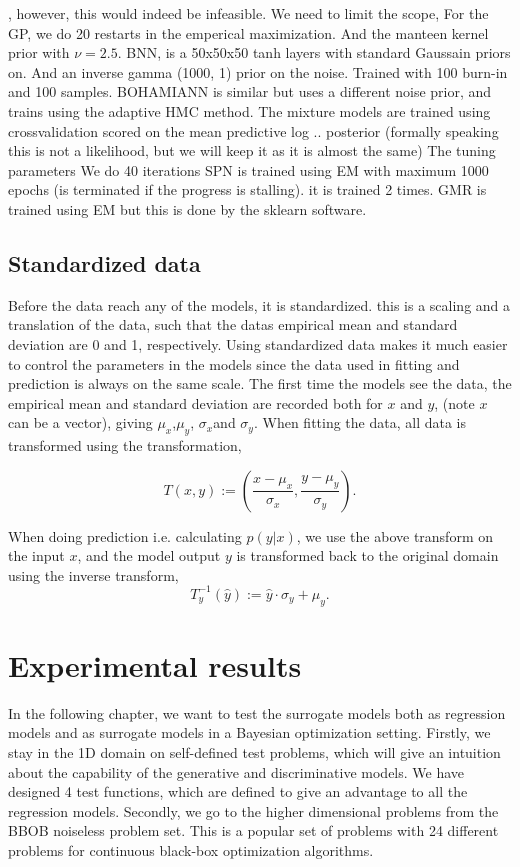 , however, this would indeed be infeasible. We need to limit the scope, 
For the GP, we do 20 restarts in the emperical maximization. And the manteen kernel prior
with $\nu = 2.5$. 
BNN, is a 50x50x50 tanh layers with standard Gaussain priors on. And an inverse gamma (1000, 1)
prior on the noise. Trained with 100 burn-in and 100 samples. 
BOHAMIANN is similar but uses a different noise prior, and trains using the adaptive HMC method. 
The mixture models are trained using crossvalidation scored on the mean predictive log .. posterior
(formally speaking this is not a likelihood, but we will keep it as it is almost the same)
The tuning parameters 
We do 40 iterations 
SPN is trained using EM with maximum 1000 epochs (is terminated if the progress is stalling). 
it is trained 2 times. 
GMR is trained using EM but this is done by the sklearn software. 

\section{Standardized data}
Before the data reach any of the models, it is standardized. this is a scaling and a translation
of the data, such that the datas empirical mean and standard deviation are 0 and 1,
respectively. Using standardized data makes it much easier to control the parameters in the models
since the data used in fitting and prediction is always on the same scale. The first time the models
see the data, the empirical mean and standard deviation are recorded both for $x$ and $y$, (note $x$
can be a vector), giving $\mu_x$,$\mu_y$, $\sigma_x$and $\sigma_y$. When fitting the data, all data
is transformed using the transformation, 

$$T(x,y) := \left(\frac{x-\mu_x}{\sigma_x}, \frac{y-\mu_y}{\sigma_y} \right).$$

When doing prediction i.e. calculating $p(y|x)$, we use the above transform on the input $x$, and
the model output $y$ is transformed back to the original domain using the inverse transform, 
$$T^{-1}_y(\hat y) :=\hat y \cdot \sigma_y+\mu_y.$$

 \chapter{Experimental results}
 In the following chapter, we want to test the surrogate models both as regression models and as surrogate
 models in a Bayesian optimization setting. Firstly, we stay in the 1D domain on self-defined test problems, 
 which will give an intuition about the capability of the generative and discriminative models. 
We have designed 4 test functions, which are defined to give an advantage to all the regression models. Secondly, 
we go to the higher dimensional problems from the BBOB noiseless problem set. This is a popular set of problems 
with 24 different problems for continuous black-box optimization algorithms.


